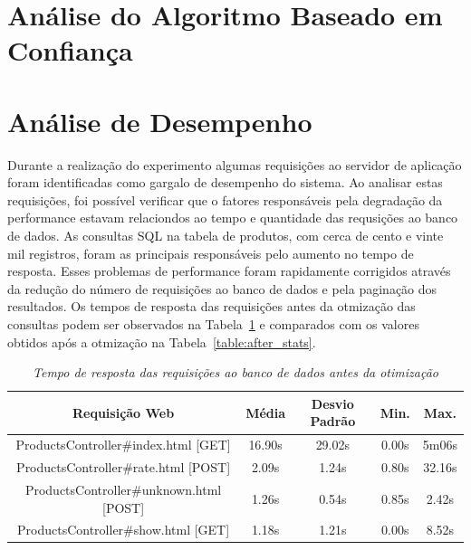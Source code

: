 
\section{Análise do Algoritmo Baseado em Confiança}
\label{sec:analise_do_algoritmo_baseado_em_confianca}


\section{Análise de Desempenho}
\label{sec:analise_de_desempenho}

Durante a realização do experimento algumas requisições ao servidor de aplicação foram identificadas como gargalo de desempenho do sistema. Ao analisar estas requisições, foi possível verificar que o fatores responsáveis pela degradação da performance estavam relaciondos ao tempo e quantidade das requsições ao banco de dados. As consultas SQL na tabela de produtos, com cerca de cento e vinte mil registros, foram as principais responsáveis pelo aumento no tempo de resposta. Esses problemas de performance foram rapidamente corrigidos através da redução do número de requisições ao banco de dados e pela paginação dos resultados. Os tempos de resposta das requisições antes da otmização das consultas podem ser observados na Tabela~\ref{table:before_stats} e comparados com os valores obtidos após a otmização na Tabela~\ref{table:after_stats}.

\begin{table}\centering
\begin{tabular}{c c c c c}
\hline \hline
\textbf{Requisição Web}
& \textbf{Média}
& \textbf{Desvio Padrão}
& \textbf{Min.} 
& \textbf{Max.} \\ \hline
ProductsController\#index.html [GET]    & 16.90s & 29.02s &  0.00s &  5m06s \\
\hline
ProductsController\#rate.html [POST]    &  2.09s &  1.24s &  0.80s & 32.16s \\
\hline
ProductsController\#unknown.html [POST] &  1.26s &  0.54s &  0.85s &  2.42s \\
\hline
ProductsController\#show.html [GET]     &  1.18s &  1.21s &  0.00s &  8.52s \\
\hline
\end{tabular}
\caption{\it Tempo de resposta das requisições ao banco de dados antes da otimização \label{table:before_stats}}
\end{table}

